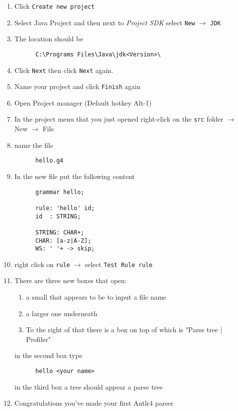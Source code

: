 \documentclass[../setup.tex]{subfiles}
\begin{document}
  \begin{enumerate}
    \item Click \texttt{Create new project}
    \item Select Java Project and then next to \textit{Project SDK} select \texttt{New} $\rightarrow$ \texttt{JDK}
    \item The location should be
    \begin{lstlisting}
      C:\Programs Files\Java\jdk<Version>\
    \end{lstlisting}
    \item Click \texttt{Next} then click \texttt{Next} again.
    \item Name your project and click \texttt{Finish} again
    \item Open Project manager (Default hotkey Alt-1)
    \item In the project menu that you just opened right-click on the \texttt{src} folder $\rightarrow$ New $\rightarrow$ File
    \item name the file
    \begin{lstlisting}
      hello.g4
    \end{lstlisting}
    \item In the new file put the following content
    \begin{lstlisting}
      grammar hello;

      rule: 'hello' id;
      id  : STRING;

      STRING: CHAR+;
      CHAR: [a-z|A-Z];
      WS: ' '+ -> skip;
    \end{lstlisting}
    \item right click on \texttt{rule} $\rightarrow$ select \texttt{Test Rule rule}
    \item There are three new boxes that open:
    \begin{enumerate}
      \item a small that appears to be to input a file name
      \item a larger one underneath
      \item To the right of that there is a box on top of which is "Parse tree | Profiler"
    \end{enumerate}
    in the second box type
    \begin{lstlisting}
      hello <your name>
    \end{lstlisting}
    in the third box a tree should appear a parse tree
    \item Congratulations you've made your first Antlr4 parser

  \end{enumerate}
\end{document}
